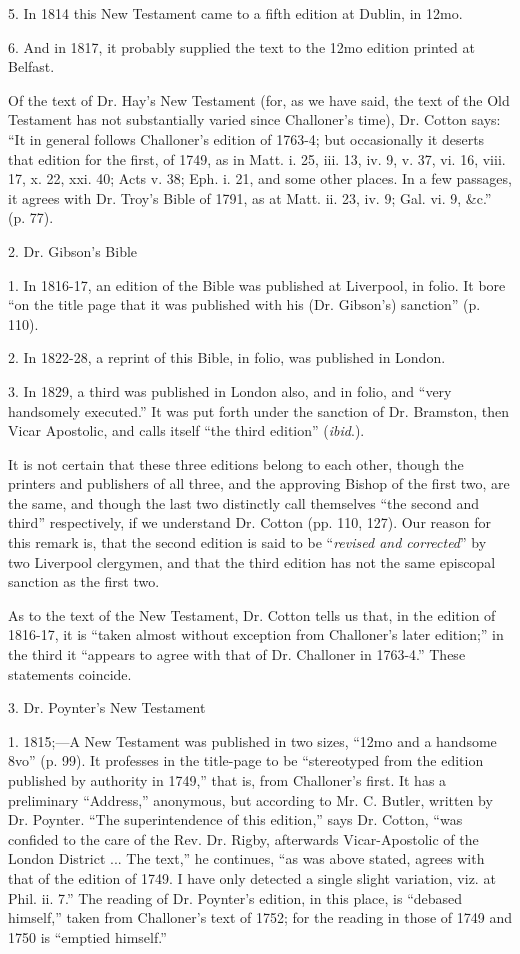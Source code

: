 5. In 1814 this New Testament came to a fifth edition at Dublin, in
12mo.

6. And in 1817, it probably supplied the text to the 12mo edition
printed at Belfast.

Of the text of Dr. Hay's New Testament (for, as we have said,
the text of the Old Testament has not substantially varied since
Challoner's time), Dr. Cotton says: ``It in general follows
Challoner's edition of 1763-4; but occasionally it deserts that
edition for the first, of 1749, as in Matt. i. 25, iii. 13, iv. 9, v.
37, vi. 16, viii. 17, x. 22, xxi. 40; Acts v. 38; Eph. i. 21, and some
other places. In a few passages, it agrees with Dr. Troy's Bible of
1791, as at Matt. ii. 23, iv. 9; Gal. vi. 9, \&c.'' (p. 77).

2. Dr. Gibson's Bible

1. In 1816-17, an edition of the Bible was published at Liverpool,
in folio. It bore ``on the title page that it was published with
his (Dr. Gibson's) sanction'' (p. 110).

2. In 1822-28, a reprint of this Bible, in folio, was published in
London.

3. In 1829, a third was published in London also, and in folio, and
``very handsomely executed.'' It was put forth under the
sanction of Dr. Bramston, then Vicar Apostolic, and calls itself
``the third edition'' (\emph{ibid}.).

It is not certain that these three editions belong to each other,
though the printers and publishers of all three, and the approving
Bishop of the first two, are the same, and though the last two
distinctly call themselves ``the second and third''
respectively, if we understand Dr. Cotton (pp. 110, 127). Our reason
for this remark is, that the second edition is said to be ``\emph{revised
and corrected}'' by two Liverpool clergymen, and that the third
edition has not the same episcopal sanction as the first two.

As to the text of the New Testament, Dr. Cotton tells us
that, in the edition of 1816-17, it is ``taken almost without
exception from Challoner's later edition;'' in the third it
``appears to agree with that of Dr. Challoner in 1763-4.''
These statements coincide.

3. Dr. Poynter's New Testament

1. 1815;—A New Testament was published in two sizes, ``12mo
and a handsome 8vo'' (p. 99). It professes in the title-page to be
``stereotyped from the edition published by authority in
1749,'' that is, from Challoner's first. It has a preliminary
``Address,'' anonymous, but according to Mr. C. Butler,
written by Dr. Poynter. ``The superintendence of this
edition,'' says Dr. Cotton, ``was confided to the care of the
Rev. Dr. Rigby, afterwards Vicar-Apostolic of the London District ...
The text,'' he continues, ``as was above stated, agrees with
that of the edition of 1749. I have only detected a single slight
variation, viz. at Phil. ii. 7.'' The reading of Dr. Poynter's
edition, in this place, is ``debased himself,'' taken from
Challoner's text of 1752; for the reading in those of 1749 and 1750 is
``emptied himself.''

